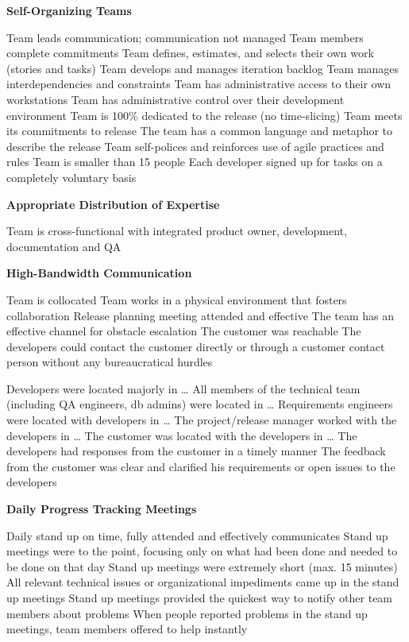 \begin{appendices}
\textbf{Self-Organizing Teams}
\begin{itemize}
	\taa Team leads communication; communication not managed
	\taa Team members complete commitments
	\taa Team defines, estimates, and selects their own work (stories and tasks)
	\taar Team develops and manages iteration backlog
	\taar Team manages interdependencies and constraints %
	\taar Team has administrative access to their own workstations
	\taar Team has administrative control over their development environment
	\taar Team is 100\% dedicated to the release (no time-slicing)
	\taar Team meets its commitments to release
	\taar The team has a common language and metaphor to describe the release
	\taar Team self-polices and reinforces use of agile practices and rules
	\taar Team is smaller than 15 people
	\pam Each developer signed up for tasks on a completely voluntary basis
\end{itemize}

\textbf{Appropriate Distribution of Expertise}
\begin{itemize}
	\taa Team is cross-functional with integrated product owner, development, documentation and QA
\end{itemize}

\textbf{High-Bandwidth Communication}
\begin{itemize}
	\taa Team is collocated
	\taa Team works in a physical environment that fosters collaboration
	\taa Release planning meeting attended and effective
	\taar The team has an effective channel for obstacle escalation
	\pam The customer was reachable
	\pam The developers could contact the customer directly or through a customer contact person without any bureaucratical hurdles

	\pam Developers were located majorly in \ldots
	\pam All members of the technical team (including QA engineers, db admins) were located in \ldots
	\pam Requirements engineers were located with developers in \ldots
	\pam The project/release manager worked with the developers in \ldots
	\pam The customer was located with the developers in \ldots
	\pamr The developers had responses from the customer in a timely manner
	\pamr The feedback from the customer was clear and clarified his requirements or open issues to the developers
\end{itemize}

\textbf{Daily Progress Tracking Meetings}
\begin{itemize}
	\taar Daily stand up on time, fully attended and effectively communicates
	\pam Stand up meetings were to the point, focusing only on what had been done and needed to be done on that day
	\pamr Stand up meetings were extremely short (max. 15 minutes)
	\pamr All relevant technical issues or organizational impediments came up in the stand up meetings
	\pamr Stand up meetings provided the quickest way to notify other team members about problems
	\pamr When people reported problems in the stand up meetings, team members offered to help instantly
\end{itemize}


\end{appendices}
